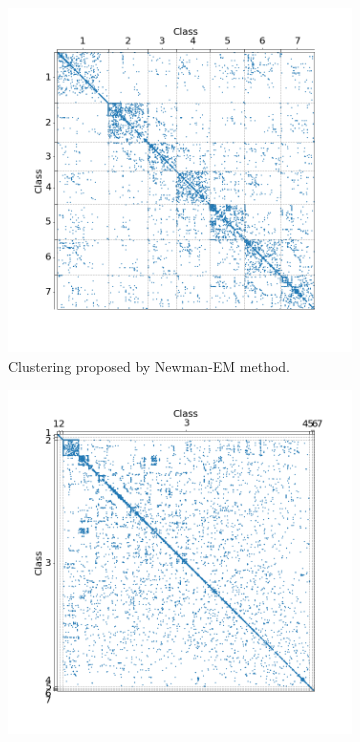\documentclass[switch, 12pt]{article}
\begin{document}
\begin{figure}[H]
    \medskip

    \hfill
    \begin{subfigure}{0.45\linewidth}
        \centering
        \includegraphics[width=\linewidth, trim={45 35 35 40}, clip]{figures/cora_Newman.png}
        \caption{Clustering proposed by Newman-EM method.}
        \label{fig:cora_newman}
    \end{subfigure}
    \hfill
    \begin{subfigure}{0.45\linewidth}
        \centering
        \includegraphics[width=\linewidth, trim={35 25 25 30}, clip]{figures/cora_spetral.png}

\end{subfigure}
\end{figure}
\end{document}
